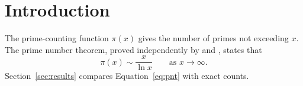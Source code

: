 \section{Introduction}
\label{sec:intro}

The prime-counting function $\pi(x)$ gives the number of primes not exceeding $x$.
The prime number theorem, proved independently by \citet{hadamard1896} and
\citet{poussin1896}, states that
\begin{equation}
  \label{eq:pnt}
  \pi(x) \sim \frac{x}{\ln x} \qquad \text{as } x \to \infty.
\end{equation}
Section~\ref{sec:results} compares Equation~\eqref{eq:pnt} with exact counts.
